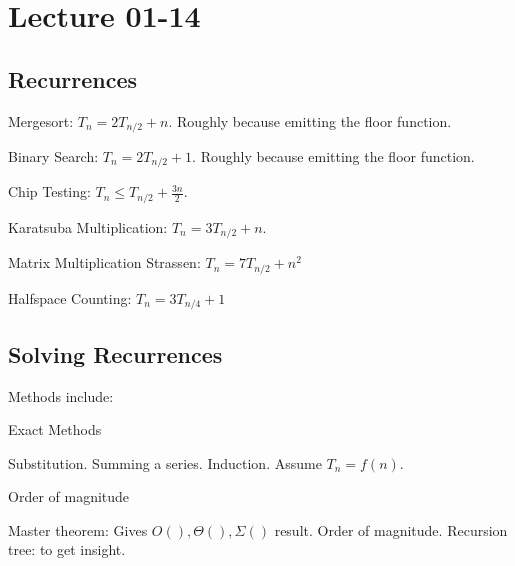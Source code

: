 \documentclass[class=scrartcl, crop=false]{standalone}
\date{2020-01-14}
\begin{document}
\section{Lecture 01-14}

\subsection{Recurrences}

Mergesort: $T_n = 2T_{n / 2} + n$. Roughly because emitting the floor function.

Binary Search:  $T_n = 2T_{n / 2} + 1$. Roughly because emitting the floor function.

Chip Testing: $T_n \leq T_{n / 2} + \frac{3n}{2}$.

Karatsuba Multiplication: $T_n = 3T_{n / 2} + n$. %

Matrix Multiplication Strassen: $T_n = 7T_{n / 2} + n^2$

Halfspace Counting: $T_n = 3T_{n / 4} + 1$

\subsection{Solving Recurrences}

Methods include: 
\begin{enumerate}
  \ii
  Exact Methods
  \begin{enumerate}
    \ii
    Substitution. Summing a series.
    \ii
    Induction. Assume $T_n = f(n)$.
  \end{enumerate} 
  \ii
  Order of magnitude
  \begin{enumerate}
    \ii
    Master theorem: Gives $O(), \Theta(), \Sigma()$ result. Order of magnitude.
    \ii
    Recursion tree: to get insight.
  \end{enumerate} 
\end{enumerate} 
\end{document}
